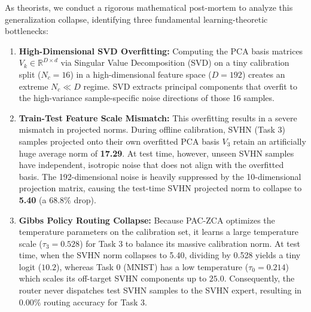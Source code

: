 As theorists, we conduct a rigorous mathematical post-mortem to analyze this generalization collapse, identifying three fundamental learning-theoretic bottlenecks:
\begin{enumerate}
    \item \textbf{High-Dimensional SVD Overfitting:} Computing the PCA basis matrices $V_k \in \mathbb{R}^{D \times d}$ via Singular Value Decomposition (SVD) on a tiny calibration split ($N_c = 16$) in a high-dimensional feature space ($D=192$) creates an extreme $N_c \ll D$ regime. SVD extracts principal components that overfit to the high-variance sample-specific noise directions of those 16 samples.
    \item \textbf{Train-Test Feature Scale Mismatch:} This overfitting results in a severe mismatch in projected norms. During offline calibration, SVHN (Task 3) samples projected onto their own overfitted PCA basis $V_3$ retain an artificially huge average norm of \textbf{17.29}. At test time, however, unseen SVHN samples have independent, isotropic noise that does not align with the overfitted basis. The 192-dimensional noise is heavily suppressed by the 10-dimensional projection matrix, causing the test-time SVHN projected norm to collapse to \textbf{5.40} (a $68.8\%$ drop).
    \item \textbf{Gibbs Policy Routing Collapse:} Because PAC-ZCA optimizes the temperature parameters on the calibration set, it learns a large temperature scale ($\tau_3 = 0.528$) for Task 3 to balance its massive calibration norm. At test time, when the SVHN norm collapses to 5.40, dividing by 0.528 yields a tiny logit ($10.2$), whereas Task 0 (MNIST) has a low temperature ($\tau_0 = 0.214$) which scales its off-target SVHN components up to $25.0$. Consequently, the router never dispatches test SVHN samples to the SVHN expert, resulting in $0.00\%$ routing accuracy for Task 3.
\end{enumerate}

